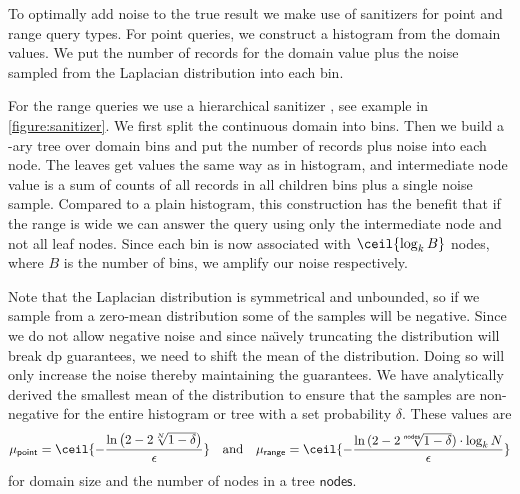 		To optimally add noise to the true result we make use of sanitizers for point and range query types.
		For point queries, we construct a histogram from the domain values.
		We put the number of records for the domain value plus the noise sampled from the Laplacian distribution into each bin.

		

		For the range queries we use a hierarchical sanitizer \cite{hierarchical-methods-for-dp}, see example in \cref{figure:sanitizer}.
		We first split the continuous domain into bins.
		Then we build a \fanout{}-ary tree over domain bins and put the number of records plus noise into each node.
		The leaves get values the same way as in histogram, and intermediate node value is a sum of counts of all records in all children bins plus a single noise sample.
		Compared to a plain histogram, this construction has the benefit that if the range is wide we can answer the query using only the intermediate node and not all leaf nodes.
		Since each bin is now associated with $\ceil{\log_\fanout B}$ nodes, where $B$ is the number of bins, we amplify our noise respectively.

		Note that the Laplacian distribution is symmetrical and unbounded, so if we sample from a zero-mean distribution some of the samples will be negative.
		Since we do not allow negative noise and since na\"{\i}vely truncating the distribution will break \acrshort{dp} guarantees, we need to shift the mean of the distribution.
		Doing so will only increase the noise thereby maintaining the guarantees.
		We have analytically derived the smallest mean of the distribution to ensure that the samples are non-negative for the entire histogram or tree with a set probability $\delta$.
		These values are
		\[
			\mu_{\mathsf{point}} = \ceil{ -\frac{ \ln \left( 2 - 2 \sqrt[\domainSize]{1 - \delta} \right) }{ \epsilon } } \quad \text{and} \quad \mu_{\mathsf{range}} = \ceil{ -\frac{ \ln{ (2 - 2 \sqrt[\mathsf{nodes}]{ 1 - \delta } ) } \cdot \log_{\fanout} \domainSize }{\epsilon} }
		\]
		for domain size \domainSize{} and the number of nodes in a tree $\mathsf{nodes}$.

